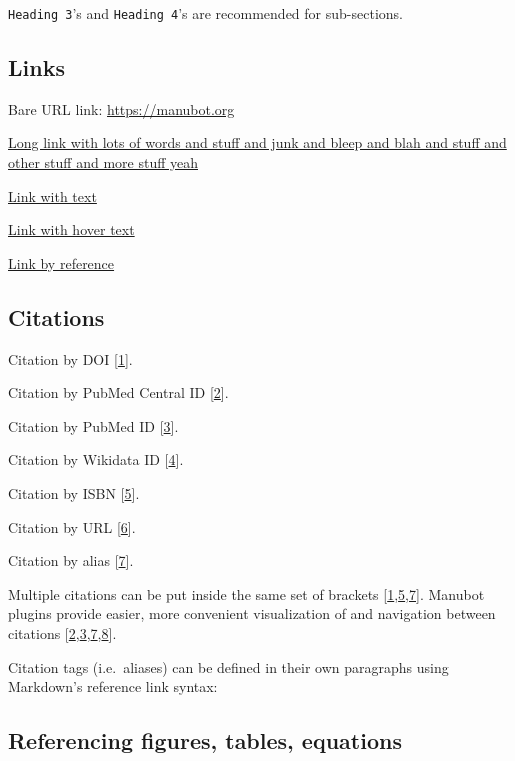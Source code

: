 \texttt{Heading\ 3}'s and \texttt{Heading\ 4}'s are recommended for sub-sections.

\hypertarget{links}{%
\subsection{Links}\label{links}}

Bare URL link: \url{https://manubot.org}

\href{https://manubot.org}{Long link with lots of words and stuff and junk and bleep and blah and stuff and other stuff and more stuff yeah}

\href{https://manubot.org}{Link with text}

\href{https://manubot.org}{Link with hover text}

\href{https://manubot.org}{Link by reference}

\hypertarget{citations}{%
\subsection{Citations}\label{citations}}

Citation by DOI {[}\protect\hyperlink{ref-IhliSZDo}{1}{]}.

Citation by PubMed Central ID {[}\protect\hyperlink{ref-mSMVRkoc}{2}{]}.

Citation by PubMed ID {[}\protect\hyperlink{ref-126Wi5Us4}{3}{]}.

Citation by Wikidata ID {[}\protect\hyperlink{ref-QhC8yJ7V}{4}{]}.

Citation by ISBN {[}\protect\hyperlink{ref-zBPP9YKu}{5}{]}.

Citation by URL {[}\protect\hyperlink{ref-1GGGHdsew}{6}{]}.

Citation by alias {[}\protect\hyperlink{ref-PZMP42Ak}{7}{]}.

Multiple citations can be put inside the same set of brackets {[}\protect\hyperlink{ref-IhliSZDo}{1},\protect\hyperlink{ref-zBPP9YKu}{5},\protect\hyperlink{ref-PZMP42Ak}{7}{]}.
Manubot plugins provide easier, more convenient visualization of and navigation between citations {[}\protect\hyperlink{ref-mSMVRkoc}{2},\protect\hyperlink{ref-126Wi5Us4}{3},\protect\hyperlink{ref-PZMP42Ak}{7},\protect\hyperlink{ref-YuJbg3zO}{8}{]}.

Citation tags (i.e.~aliases) can be defined in their own paragraphs using Markdown's reference link syntax:

\hypertarget{referencing-figures-tables-equations}{%
\subsection{Referencing figures, tables, equations}\label{referencing-figures-tables-equations}}

